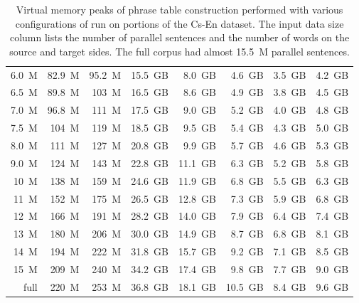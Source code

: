 \begin{table}[!htb]
\begin{tabular}{ | r  r  r | r  r  r  r  r | }
6.0~M & 82.9~M & 95.2~M & 15.5~GB & 8.0~GB & 4.6~GB & 3.5~GB & 4.2~GB \\
6.5~M & 89.8~M & 103~M & 16.5~GB & 8.6~GB & 4.9~GB & 3.8~GB & 4.5~GB \\
7.0~M & 96.8~M & 111~M & 17.5~GB & 9.0~GB & 5.2~GB & 4.0~GB & 4.8~GB \\
7.5~M & 104~M & 119~M & 18.5~GB & 9.5~GB & 5.4~GB & 4.3~GB & 5.0~GB \\
8.0~M & 111~M & 127~M & 20.8~GB & 9.9~GB & 5.7~GB & 4.6~GB & 5.3~GB \\
9.0~M & 124~M & 143~M & 22.8~GB & 11.1~GB & 6.3~GB & 5.2~GB & 5.8~GB \\
10~M & 138~M & 159~M & 24.6~GB & 11.9~GB & 6.8~GB & 5.5~GB & 6.3~GB \\
11~M & 152~M & 175~M & 26.5~GB & 12.8~GB & 7.3~GB & 5.9~GB & 6.8~GB \\
12~M & 166~M & 191~M & 28.2~GB & 14.0~GB & 7.9~GB & 6.4~GB & 7.4~GB \\
13~M & 180~M & 206~M & 30.0~GB & 14.9~GB & 8.7~GB & 6.8~GB & 8.1~GB \\
14~M & 194~M & 222~M & 31.8~GB & 15.7~GB & 9.2~GB & 7.1~GB & 8.5~GB \\
15~M & 209~M & 240~M & 34.2~GB & 17.4~GB & 9.8~GB & 7.7~GB & 9.0~GB \\
full & 220~M & 253~M & 36.8~GB & 18.1~GB & 10.5~GB & 8.4~GB & 9.6~GB \\
\hline
\end{tabular}
\caption{\label{cs-en-memory-benchmarking}
Virtual memory peaks of phrase table construction performed with
various configurations of \eppex{} run on portions of the Cs-En dataset.
The input data size column lists the number of parallel sentences and the number of words on the source and target sides.
The full corpus had almost 15.5~M parallel sentences.}
\end{table}

